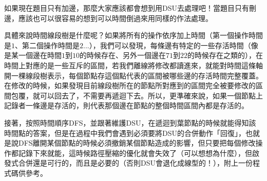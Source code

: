如果現在題目只有加邊，那麼大家應該都會想到用DSU去處理吧！當題目只有刪邊，應該也可以很容易的想到可以時間倒過來用同樣的作法處理。

具體來說時間線段樹是什麼呢？如果將所有的操作依序加上時間（第一個操作時間是$1$、第二個操作時間是$2$...），我們可以發現，每條邊有特定的一些存活時間（像是某一個邊在時間$1$到$10$的時候存在、另外一個邊在$71$到$22$的時候存在之類的），在時間上對應的是一些互斥的區間，若我們離線將修改都讀進來，就能對時間這條軸開一棵線段樹表示，每個節點存這個點代表的區間被哪些邊的存活時間完整覆蓋。在修改的時候，如果發現目前線段樹所在的節點所對應到的區間完全被要修改的區間包覆，就可以回去了，不需要再遞迴下去。所以，更準確來說，如果一個節點上記錄者一條邊是存活的，則代表那個邊在節點的整個時間區間內都是存活的。

接著，按照時間順序DFS，並跟著維護DSU，在遞迴到葉節點的時候就能得知該時間點的答案，但是在過程中我們會遇到必須要將DSU的合併動作「回復」，也就是說DFS離開某個節點的時候必須撤銷某個節點造成的影響，但只要把每個修改操作都記錄下來就能，這時候路徑壓縮的優化就會失效了（可以想想為什麼），但啟發式合併還是可行的，而且是必要的（否則DSU會退化成線型的！），附上一份程式碼供參考。



